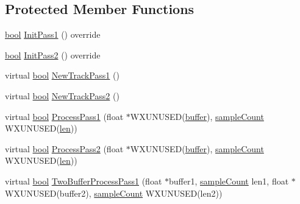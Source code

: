 \subsection*{Protected Member Functions}
\begin{DoxyCompactItemize}
\item 
\hyperlink{mac_2config_2i386_2lib-src_2libsoxr_2soxr-config_8h_abb452686968e48b67397da5f97445f5b}{bool} \hyperlink{class_effect_two_pass_simple_mono_a95c60b4193bbdc2bfb2d27b42c0693ee}{Init\+Pass1} () override
\item 
\hyperlink{mac_2config_2i386_2lib-src_2libsoxr_2soxr-config_8h_abb452686968e48b67397da5f97445f5b}{bool} \hyperlink{class_effect_two_pass_simple_mono_ada2e5370a99d5579a7a1f42e53f5c130}{Init\+Pass2} () override
\item 
virtual \hyperlink{mac_2config_2i386_2lib-src_2libsoxr_2soxr-config_8h_abb452686968e48b67397da5f97445f5b}{bool} \hyperlink{class_effect_two_pass_simple_mono_a39fac2b4a9c6bdb9e51ee98e608cec7d}{New\+Track\+Pass1} ()
\item 
virtual \hyperlink{mac_2config_2i386_2lib-src_2libsoxr_2soxr-config_8h_abb452686968e48b67397da5f97445f5b}{bool} \hyperlink{class_effect_two_pass_simple_mono_ae4a87b42d7294c03fdc2eaa49ca68bba}{New\+Track\+Pass2} ()
\item 
virtual \hyperlink{mac_2config_2i386_2lib-src_2libsoxr_2soxr-config_8h_abb452686968e48b67397da5f97445f5b}{bool} \hyperlink{class_effect_two_pass_simple_mono_a1711ffe38972e5f767b628b237d5e306}{Process\+Pass1} (float $\ast$W\+X\+U\+N\+U\+S\+ED(\hyperlink{structbuffer}{buffer}), \hyperlink{include_2audacity_2_types_8h_afa427e1f521ea5ec12d054e8bd4d0f71}{sample\+Count} W\+X\+U\+N\+U\+S\+ED(\hyperlink{lib_2expat_8h_af86d325fecfc8f47b61fbf5a5146f582}{len}))
\item 
virtual \hyperlink{mac_2config_2i386_2lib-src_2libsoxr_2soxr-config_8h_abb452686968e48b67397da5f97445f5b}{bool} \hyperlink{class_effect_two_pass_simple_mono_a2f79dba4581f0afeb7431ab5e8d0149a}{Process\+Pass2} (float $\ast$W\+X\+U\+N\+U\+S\+ED(\hyperlink{structbuffer}{buffer}), \hyperlink{include_2audacity_2_types_8h_afa427e1f521ea5ec12d054e8bd4d0f71}{sample\+Count} W\+X\+U\+N\+U\+S\+ED(\hyperlink{lib_2expat_8h_af86d325fecfc8f47b61fbf5a5146f582}{len}))
\item 
virtual \hyperlink{mac_2config_2i386_2lib-src_2libsoxr_2soxr-config_8h_abb452686968e48b67397da5f97445f5b}{bool} \hyperlink{class_effect_two_pass_simple_mono_a51b1556b2e45bc773c854c872c4ec40f}{Two\+Buffer\+Process\+Pass1} (float $\ast$buffer1, \hyperlink{include_2audacity_2_types_8h_afa427e1f521ea5ec12d054e8bd4d0f71}{sample\+Count} len1, float $\ast$W\+X\+U\+N\+U\+S\+ED(buffer2), \hyperlink{include_2audacity_2_types_8h_afa427e1f521ea5ec12d054e8bd4d0f71}{sample\+Count} W\+X\+U\+N\+U\+S\+ED(len2))

\end{DoxyCompactItemize}
